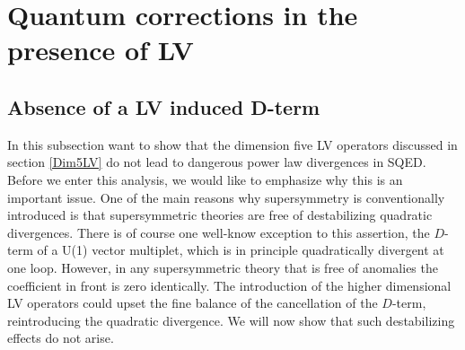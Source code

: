 \documentclass[12pt]{revtex4}
\begin{document}
\section{Quantum corrections in the presence of LV}
\label{quantum}




\subsection{Absence of a LV induced D-term}
\label{noDterm}

In this subsection want to show that the dimension five LV operators
discussed in section \ref{Dim5LV} do not lead to dangerous power 
law divergences in SQED. Before we enter this analysis, we would like
to emphasize why this is an important issue. One of the main reasons
why supersymmetry is conventionally introduced is that 
supersymmetric theories are free of destabilizing quadratic
divergences. There is of course one well-know 
exception to this assertion, the $D$-term of a U(1) vector multiplet,
which is in principle quadratically divergent at one loop. 
However, in any supersymmetric theory that is free of anomalies the
coefficient in front is zero identically. The introduction of the
higher dimensional LV operators could upset the fine balance of the
cancellation of the $D$-term, reintroducing the quadratic
divergence. We will now show that such destabilizing effects do not
arise. 
\end{document}
